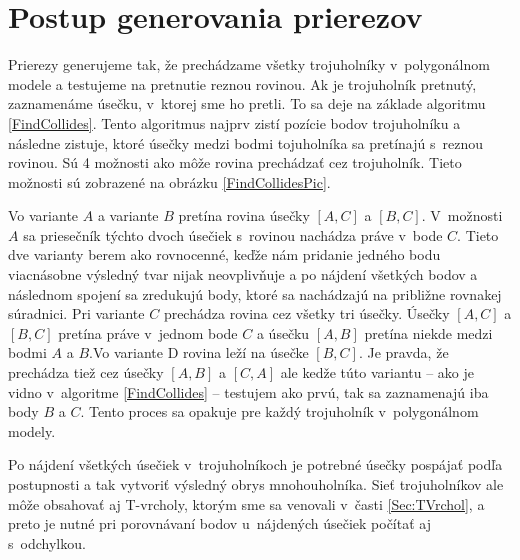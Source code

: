 \section{Postup generovania prierezov}
Prierezy generujeme tak, že prechádzame všetky trojuholníky v~polygonálnom modele a testujeme na pretnutie reznou rovinou. Ak je trojuholník pretnutý, zaznamenáme úsečku, v~ktorej sme ho pretli. To sa deje na základe algoritmu \ref{FindCollides}. Tento algoritmus najprv zistí pozície bodov trojuholníku a následne zistuje, ktoré úsečky medzi bodmi tojuholníka sa pretínajú s~reznou rovinou. Sú 4 možnosti ako môže rovina prechádzať cez trojuholník. Tieto možnosti sú zobrazené na obrázku \ref{FindCollidesPic}.

Vo variante $A$ a variante $B$ pretína rovina úsečky $[A,C]$ a $[B,C]$. V~možnosti $A$ sa priesečník týchto dvoch úsečiek s~rovinou nachádza práve v~bode $C$. Tieto dve varianty berem ako rovnocenné, keďže nám pridanie jedného bodu viacnásobne výsledný tvar nijak neovplivňuje a po nájdení všetkých bodov a následnom spojení sa zredukujú body, ktoré sa nachádzajú na približne rovnakej súradnici.
Pri variante $C$ prechádza rovina cez všetky tri úsečky. Úsečky $[A,C]$ a $[B,C]$ pretína práve v~jednom bode $C$ a úsečku $[A,B]$ pretína niekde medzi bodmi $A$ a $B$.Vo variante D rovina leží na úsečke $[B,C]$. Je pravda, že prechádza tiež cez úsečky $[A,B]$ a $[C,A]$ ale kedže túto variantu -- ako je vidno v~algoritme \ref{FindCollides} -- testujem ako prvú, tak sa zaznamenajú iba body $B$ a $C$.
Tento proces sa opakuje pre každý trojuholník v~polygonálnom modely.

Po nájdení všetkých úsečiek v~trojuholníkoch je potrebné úsečky pospájať podľa postupnosti a tak vytvoriť výsledný obrys mnohouholníka.
Sieť trojuholníkov ale môže obsahovať aj T-vrcholy, ktorým sme sa venovali v~časti \ref{Sec:TVrchol}, a preto je nutné pri porovnávaní bodov u~nájdených úsečiek počítať aj s~odchylkou.




